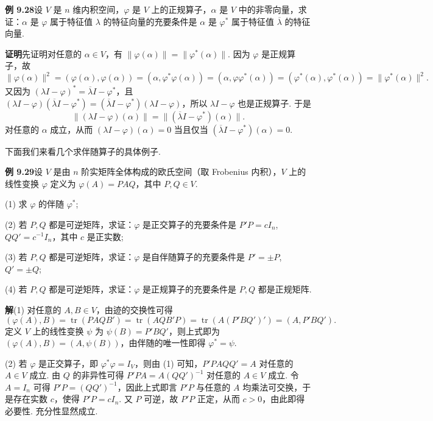\documentclass[UTF8, 12pt, fontset=fandol, oneside]{ctexart}
\begin{document}
\noindent\textbf{例 9.28}\quad 设 $V$ 是 $n$ 维内积空间，$\varphi$ 是 $V$ 上的正规算子，$\alpha$ 是 $V$ 中的非零向量，求证：$\alpha$ 是 $\varphi$ 属于特征值 $\lambda$ 的特征向量的充要条件是 $\alpha$ 是 $\varphi^*$ 属于特征值 $\overline{\lambda}$ 的特征向量.

\noindent\textbf{证明}\quad 先证明对任意的 $\alpha\in V$，有 $\|\varphi(\alpha)\|=\|\varphi^*(\alpha)\|$. 因为 $\varphi$ 是正规算子，故
\[
\|\varphi(\alpha)\|^2=(\varphi(\alpha),\varphi(\alpha))=(\alpha,\varphi^*\varphi(\alpha))
=(\alpha,\varphi\varphi^*(\alpha))=(\varphi^*(\alpha),\varphi^*(\alpha))=\|\varphi^*(\alpha)\|^2.
\]
又因为 $(\lambda I-\varphi)^*=\overline{\lambda}I-\varphi^*$，且 $(\lambda I-\varphi)(\overline{\lambda}I-\varphi^*)=(\overline{\lambda}I-\varphi^*)(\lambda I-\varphi)$，所以 $\lambda I-\varphi$ 也是正规算子. 于是
\[
\|(\lambda I-\varphi)(\alpha)\|=\|(\overline{\lambda}I-\varphi^*)(\alpha)\|.
\]
对任意的 $\alpha$ 成立，从而 $(\lambda I-\varphi)(\alpha)=0$ 当且仅当 $(\overline{\lambda}I-\varphi^*)(\alpha)=0$.

下面我们来看几个求伴随算子的具体例子.

\noindent\textbf{例 9.29}\quad 设 $V$ 是由 $n$ 阶实矩阵全体构成的欧氏空间（取 Frobenius 内积），$V$ 上的线性变换 $\varphi$ 定义为 $\varphi(A)=PAQ$，其中 $P,Q\in V$.

(1) 求 $\varphi$ 的伴随 $\varphi^*$;

(2) 若 $P,Q$ 都是可逆矩阵，求证：$\varphi$ 是正交算子的充要条件是 $P'P=cI_n$, $QQ'=c^{-1}I_n$，其中 $c$ 是正实数;

(3) 若 $P,Q$ 都是可逆矩阵，求证：$\varphi$ 是自伴随算子的充要条件是 $P'=\pm P$, $Q'=\pm Q$;

(4) 若 $P,Q$ 都是可逆矩阵，求证：$\varphi$ 是正规算子的充要条件是 $P,Q$ 都是正规矩阵.

\noindent\textbf{解}\quad (1) 对任意的 $A,B\in V$，由迹的交换性可得
\[
(\varphi(A),B)=\operatorname{tr}(PAQB')=\operatorname{tr}(AQB'P)
=\operatorname{tr}(A(P'BQ')')=(A,P'BQ').
\]
定义 $V$ 上的线性变换 $\psi$ 为 $\psi(B)=P'BQ'$，则上式即为 $(\varphi(A),B)=(A,\psi(B))$，由伴随的唯一性即得 $\varphi^*=\psi$.

(2) 若 $\varphi$ 是正交算子，即 $\varphi^*\varphi=I_V$，则由 (1) 可知，$P'PAQQ'=A$ 对任意的 $A\in V$ 成立. 由 $Q$ 的非异性可得 $P'PA=A(QQ')^{-1}$ 对任意的 $A\in V$ 成立. 令 $A=I_n$ 可得 $P'P=(QQ')^{-1}$，因此上式即言 $P'P$ 与任意的 $A$ 均乘法可交换，于是存在实数 $c$，使得 $P'P=cI_n$. 又 $P$ 可逆，故 $P'P$ 正定，从而 $c>0$，由此即得必要性. 充分性显然成立.
\end{document}

